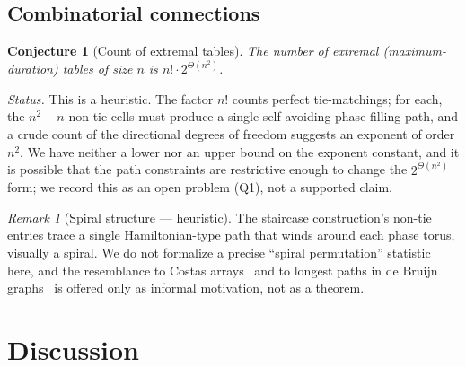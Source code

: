 \documentclass[11pt]{article}
\newtheorem{conjecture}{Conjecture}
\theoremstyle{definition}
\theoremstyle{remark}
\newtheorem{remark}{Remark}
\begin{document}
\subsection{Combinatorial connections}
\begin{conjecture}[Count of extremal tables]\label{conj:count}
The number of extremal (maximum-duration) tables of size $n$ is $n! \cdot 2^{\Theta(n^2)}$.
\end{conjecture}
\noindent\emph{Status.} This is a heuristic. The factor $n!$ counts perfect tie-matchings; for each, the $n^2 - n$ non-tie
cells must produce a single self-avoiding phase-filling path, and a crude count of the directional degrees of freedom
suggests an exponent of order $n^2$. We have neither a lower nor an upper bound on the exponent constant, and it is
possible that the path constraints are restrictive enough to change the $2^{\Theta(n^2)}$ form; we record this as an open
problem (Q1), not a supported claim.

\begin{remark}[Spiral structure --- heuristic]\label{rem:spiral}
The staircase construction's non-tie entries trace a single Hamiltonian-type path that winds around each phase torus,
visually a spiral. We do not formalize a precise ``spiral permutation'' statistic here, and the resemblance to Costas
arrays~\cite{Costas} and to longest paths in de Bruijn graphs~\cite{Knuth} is offered only as informal motivation, not as a
theorem.
\end{remark}

\section{Discussion}\label{sec:disc}
\end{document}
